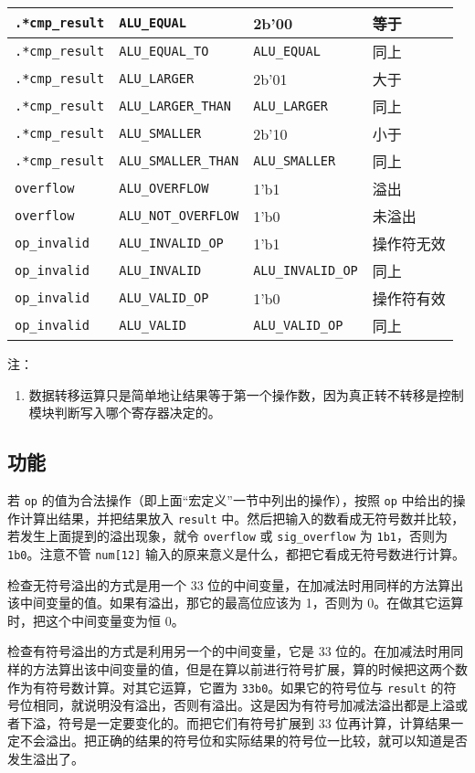 \documentclass[12pt,AutoFakeBold,AutoFakeSlant]{article}
\providecommand{\tightlist}{%
  \setlength{\itemsep}{0pt}\setlength{\parskip}{0pt}}
\begin{document}
\begin{longtable}[]{@{}|l|l|l|l|@{}}
\texttt{.*cmp\_result} & \texttt{ALU\_EQUAL} & 2b'00 &
等于\tabularnewline\hline
\texttt{.*cmp\_result} & \texttt{ALU\_EQUAL\_TO} & \texttt{ALU\_EQUAL} &
同上\tabularnewline\hline
\texttt{.*cmp\_result} & \texttt{ALU\_LARGER} & 2b'01 &
大于\tabularnewline\hline
\texttt{.*cmp\_result} & \texttt{ALU\_LARGER\_THAN} &
\texttt{ALU\_LARGER} & 同上\tabularnewline\hline
\texttt{.*cmp\_result} & \texttt{ALU\_SMALLER} & 2b'10 &
小于\tabularnewline\hline
\texttt{.*cmp\_result} & \texttt{ALU\_SMALLER\_THAN} &
\texttt{ALU\_SMALLER} & 同上\tabularnewline\hline
\texttt{overflow} & \texttt{ALU\_OVERFLOW} & 1'b1 & 溢出\tabularnewline\hline
\texttt{overflow} & \texttt{ALU\_NOT\_OVERFLOW} & 1'b0 &
未溢出\tabularnewline\hline
\texttt{op\_invalid} & \texttt{ALU\_INVALID\_OP} & 1'b1 &
操作符无效\tabularnewline\hline
\texttt{op\_invalid} & \texttt{ALU\_INVALID} & \texttt{ALU\_INVALID\_OP}
& 同上\tabularnewline\hline
\texttt{op\_invalid} & \texttt{ALU\_VALID\_OP} & 1'b0 &
操作符有效\tabularnewline\hline
\texttt{op\_invalid} & \texttt{ALU\_VALID} & \texttt{ALU\_VALID\_OP} &
同上\tabularnewline\hline

\end{longtable}

注：

\begin{enumerate}
\def\labelenumi{\arabic{enumi}.}
\tightlist
\item
  数据转移运算只是简单地让结果等于第一个操作数，因为真正转不转移是控制模块判断写入哪个寄存器决定的。
\end{enumerate}

\hypertarget{ux529fux80fd-7}{%
\subsection{功能}\label{ux529fux80fd-7}}

若 \texttt{op} 的值为合法操作（即上面``宏定义''一节中列出的操作），按照
\texttt{op} 中给出的操作计算出结果，并把结果放入 \texttt{result}
中。然后把输入的数看成无符号数并比较，若发生上面提到的溢出现象，就令
\texttt{overflow} 或 \texttt{sig\_overflow} 为
\texttt{1\textquotesingle{}b1}，否则为
\texttt{1\textquotesingle{}b0}。注意不管 \texttt{num{[}12{]}}
输入的原来意义是什么，都把它看成无符号数进行计算。

检查无符号溢出的方式是用一个 33
位的中间变量，在加减法时用同样的方法算出该中间变量的值。如果有溢出，那它的最高位应该为
1，否则为 0。在做其它运算时，把这个中间变量变为恒 0。

检查有符号溢出的方式是利用另一个的中间变量，它是 33
位的。在加减法时用同样的方法算出该中间变量的值，但是在算以前进行符号扩展，算的时候把这两个数作为有符号数计算。对其它运算，它置为
\texttt{33\textquotesingle{}b0}。如果它的符号位与 \texttt{result}
的符号位相同，就说明没有溢出，否则有溢出。这是因为有符号加减法溢出都是上溢或者下溢，符号是一定要变化的。而把它们有符号扩展到
33
位再计算，计算结果一定不会溢出。把正确的结果的符号位和实际结果的符号位一比较，就可以知道是否发生溢出了。
\end{document}
